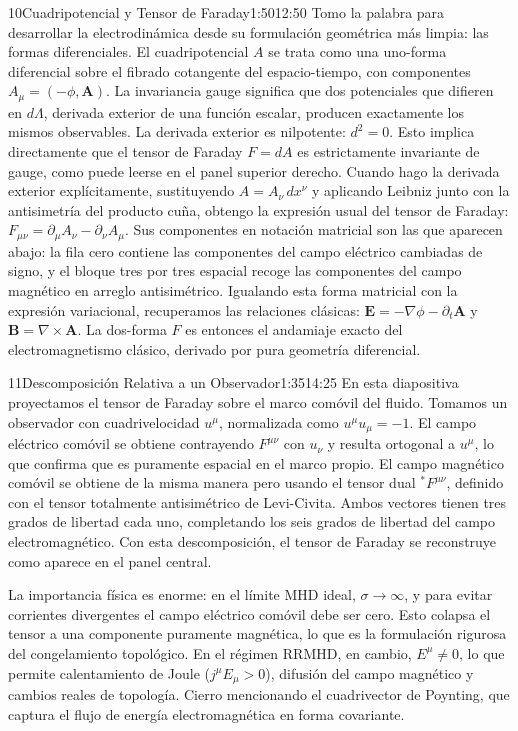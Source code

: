\documentclass[11pt,a4paper]{article}
\begin{document}
\begin{seborador}{10}{Cuadripotencial y Tensor de Faraday}{1:50}{12:50}
Tomo la palabra para desarrollar la electrodinámica desde su formulación
geométrica más limpia: las formas diferenciales. El cuadripotencial $A$ se
trata como una uno-forma diferencial sobre el fibrado cotangente del
espacio-tiempo, con componentes $A_\mu=(-\phi,\mathbf{A})$. La invariancia
gauge significa que dos potenciales que difieren en $d\Lambda$, derivada
exterior de una función escalar, producen exactamente los mismos observables.
La derivada exterior es nilpotente: $d^2=0$. Esto implica directamente que el
tensor de Faraday $F=dA$ es estrictamente invariante de gauge, como puede
leerse en el panel superior derecho. Cuando hago la derivada exterior
explícitamente, sustituyendo $A=A_\nu\,dx^\nu$ y aplicando Leibniz junto con
la antisimetría del producto cuña, obtengo la expresión usual del tensor de
Faraday: $F_{\mu\nu}=\partial_\mu A_\nu-\partial_\nu A_\mu$. Sus componentes
en notación matricial son las que aparecen abajo: la fila cero contiene las
componentes del campo eléctrico cambiadas de signo, y el bloque tres por tres
espacial recoge las componentes del campo magnético en arreglo antisimétrico.
Igualando esta forma matricial con la expresión variacional, recuperamos las
relaciones clásicas: $\mathbf{E}=-\nabla\phi-\partial_t\mathbf{A}$ y
$\mathbf{B}=\nabla\times\mathbf{A}$. La dos-forma $F$ es entonces el andamiaje
exacto del electromagnetismo clásico, derivado por pura geometría diferencial.
\end{seborador}

\begin{seborador}{11}{Descomposición Relativa a un Observador}{1:35}{14:25}
En esta diapositiva proyectamos el tensor de Faraday sobre el marco comóvil
del fluido. Tomamos un observador con cuadrivelocidad $u^\mu$, normalizada
como $u^\mu u_\mu=-1$. El campo eléctrico comóvil se obtiene contrayendo
$F^{\mu\nu}$ con $u_\nu$ y resulta ortogonal a $u^\mu$, lo que confirma que es
puramente espacial en el marco propio. El campo magnético comóvil se obtiene
de la misma manera pero usando el tensor dual ${}^*F^{\mu\nu}$, definido con
el tensor totalmente antisimétrico de Levi-Civita. Ambos vectores tienen tres
grados de libertad cada uno, completando los seis grados de libertad del
campo electromagnético. Con esta descomposición, el tensor de Faraday se
reconstruye como aparece en el panel central.

La importancia física es enorme: en el límite MHD ideal, $\sigma\to\infty$, y
para evitar corrientes divergentes el campo eléctrico comóvil debe ser cero.
Esto colapsa el tensor a una componente puramente magnética, lo que es la
formulación rigurosa del congelamiento topológico. En el régimen RRMHD, en
cambio, $E^\mu\neq 0$, lo que permite calentamiento de Joule
($j^\mu E_\mu>0$), difusión del campo magnético y cambios reales de
topología. Cierro mencionando el cuadrivector de Poynting, que captura el
flujo de energía electromagnética en forma covariante.
\end{seborador}
\end{document}
